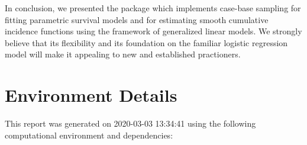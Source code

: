 \documentclass[
]{jss}
\begin{document}
In conclusion, we presented the  package 
which implements case-base sampling for fitting parametric survival
models and for estimating smooth cumulative incidence functions using
the framework of generalized linear models. We strongly believe that its
flexibility and its foundation on the familiar logistic regression model
will make it appealing to new and established practioners.

\hypertarget{environment-details}{%
\section{Environment Details}\label{environment-details}}

This report was generated on 2020-03-03 13:34:41 using the following
computational environment and dependencies:
\end{document}
